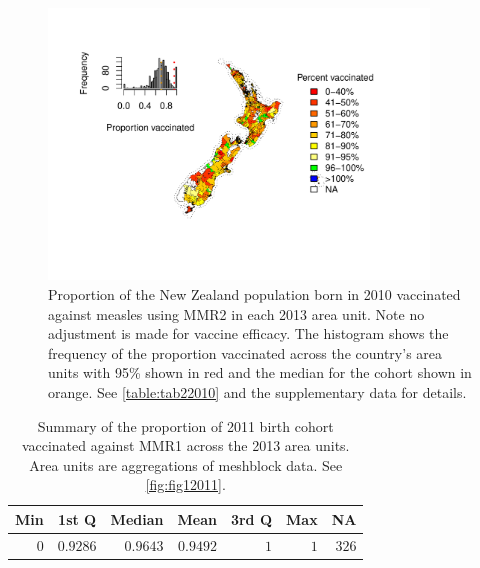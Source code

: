 \documentclass{article}
\begin{document}
\begin{figure}
\begin{center}
    \includegraphics[width=0.9\textwidth]{nir_census_MMR2_NIR_2010.pdf}
 \end{center}
    \caption{Proportion of the New Zealand population born in 2010 vaccinated against measles using MMR2 in each 2013 area unit. Note no adjustment is made for vaccine efficacy. The histogram shows the frequency of the proportion vaccinated across the country's area units with 95\% shown in red and the median for the cohort shown in orange. See \autoref{table:tab22010} and the supplementary data for details.}
\label{fig:fig22010}
\end{figure}

 \vspace{5mm} %
\begin{table}
\begin{center}
\begin{tabular}{rrrrrrr}
\hline\hline
\multicolumn{1}{c}{Min}&\multicolumn{1}{c}{1st Q}&\multicolumn{1}{c}{Median}&\multicolumn{1}{c}{Mean}&\multicolumn{1}{c}{3rd Q}&\multicolumn{1}{c}{Max}&\multicolumn{1}{c}{NA}\tabularnewline
\hline
$0$&$0.9286$&$0.9643$&$0.9492$&$1$&$1$&$326$\tabularnewline
\hline
\end{tabular}\end{center}\caption{Summary of the proportion of 2011 birth cohort vaccinated against MMR1 across the 2013 area units. Area units are aggregations of meshblock data. See \autoref{fig:fig12011}.}
\label{table:tab12011}
\end{table}
\end{document}
